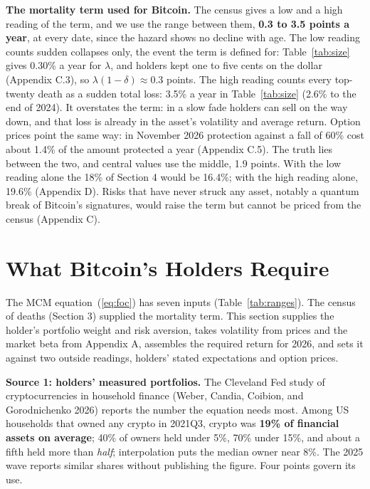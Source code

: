 \documentclass[11pt]{article}
\begin{document}
\textbf{The mortality term used for Bitcoin.} The census gives a low and a high reading of the term, and we use the range between them, \textbf{0.3 to 3.5 points a year}, at every date, since the hazard shows no decline with age. The low reading counts sudden collapses only, the event the term is defined for: Table~\ref{tab:size} gives 0.30\% a year for $\lambda$, and holders kept one to five cents on the dollar (Appendix C.3), so $\lambda(1-\delta) \approx 0.3$ points. The high reading counts every top-twenty death as a sudden total loss: 3.5\% a year in Table~\ref{tab:size} (2.6\% to the end of 2024). It overstates the term: in a slow fade holders can sell on the way down, and that loss is already in the asset's volatility and average return. Option prices point the same way: in November 2026 protection against a fall of 60\% cost about 1.4\% of the amount protected a year (Appendix C.5). The truth lies between the two, and central values use the middle, 1.9 points. With the low reading alone the 18\% of Section 4 would be 16.4\%; with the high reading alone, 19.6\% (Appendix D). Risks that have never struck any asset, notably a quantum break of Bitcoin's signatures, would raise the term but cannot be priced from the census (Appendix C).

\section{What Bitcoin's Holders Require}

The MCM equation~(\ref{eq:foc}) has seven inputs (Table~\ref{tab:ranges}). The census of deaths (Section 3) supplied the mortality term. This section supplies the holder's portfolio weight and risk aversion, takes volatility from prices and the market beta from Appendix A, assembles the required return for 2026, and sets it against two outside readings, holders' stated expectations and option prices.

\textbf{Source 1: holders' measured portfolios.} The Cleveland Fed study of cryptocurrencies in household finance (Weber, Candia, Coibion, and Gorodnichenko 2026) reports the number the equation needs most. Among US households that owned any crypto in 2021Q3, crypto was \textbf{19\% of financial assets on average}; 40\% of owners held under 5\%, 70\% under 15\%, and about a fifth held more than \emph{half}; interpolation puts the median owner near 8\%. The 2025 wave reports similar shares without publishing the figure. Four points govern its use.
\end{document}
